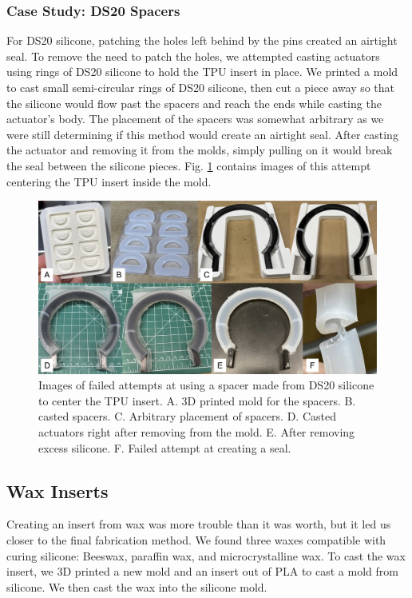 \subsubsection{Case Study: DS20 Spacers}
For DS20 silicone, patching the holes left behind by the pins created an airtight seal. To remove the need to patch the holes, we attempted casting actuators using rings of DS20 silicone to hold the TPU insert in place. We printed a mold to cast small semi-circular rings of DS20 silicone, then cut a piece away so that the silicone would flow past the spacers and reach the ends while casting the actuator's body. The placement of the spacers was somewhat arbitrary as we were still determining if this method would create an airtight seal. After casting the actuator and removing it from the molds, simply pulling on it would break the seal between the silicone pieces. Fig. \ref{fig:ds20spacer} contains images of this attempt centering the TPU insert inside the mold. 

\begin{figure}[ht]
    \centering
    \includegraphics[width=5 in]{images4/ds20spacer.jpg}
    \caption{Images of failed attempts at using a spacer made from DS20 silicone to center the TPU insert. A. 3D printed mold for the spacers. B. casted spacers. C. Arbitrary placement of spacers. D. Casted actuators right after removing from the mold. E. After removing excess silicone. F. Failed attempt at creating a seal.}
    \label{fig:ds20spacer}
\end{figure}

\clearpage
\subsection{Wax Inserts}
Creating an insert from wax was more trouble than it was worth, but it led us closer to the final fabrication method. We found three waxes compatible with curing silicone: Beeswax, paraffin wax, and microcrystalline wax. To cast the wax insert, we 3D printed a new mold and an insert out of PLA to cast a mold from silicone. We then cast the wax into the silicone mold. 

